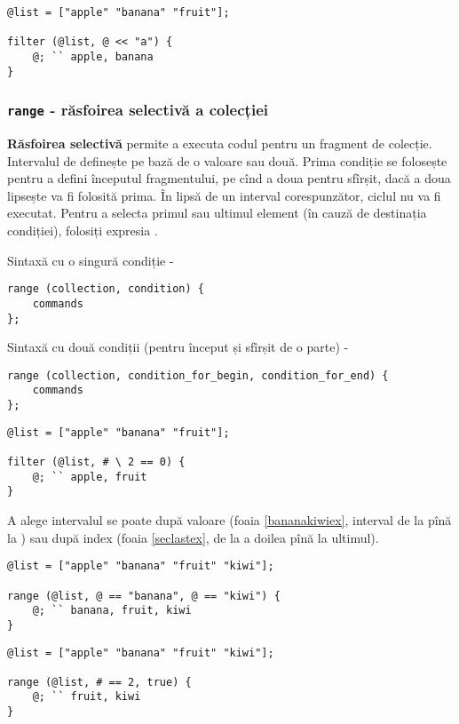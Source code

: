 \begin{lstlisting}[caption=Filtrare pe bază de valoare, label=filterdataex]
@list = ["apple" "banana" "fruit"];

filter (@list, @ << "a") {
	@; `` apple, banana
}
\end{lstlisting}

\subsubsection{\lstinline|range| - răsfoirea selectivă a colecției}

{\bf Răsfoirea selectivă} permite a executa codul pentru un fragment de colecție. Intervalul de definește pe bază de o valoare sau două. Prima condiție se folosește pentru a defini începutul fragmentului, pe cînd a doua pentru sfîrșit, dacă a doua lipsește va fi folosită prima. În lipsă de un interval corespunzător, ciclul nu va fi executat. Pentru a selecta primul sau ultimul element (în cauză de destinația condiției), folosiți expresia \true{}.

Sintaxă cu o singură condiție -
\begin{lstlisting}[numbers=none]
range (collection, condition) {
	commands
};
\end{lstlisting}

Sintaxă cu două condiții (pentru început și sfîrșit de o parte) -
\begin{lstlisting}[numbers=none]
range (collection, condition_for_begin, condition_for_end) {
	commands
};
\end{lstlisting}

\begin{lstlisting}[caption=Filtare după index, label=filterindexex]
@list = ["apple" "banana" "fruit"];

filter (@list, # \ 2 == 0) {
	@; `` apple, fruit
}
\end{lstlisting}

A alege intervalul se poate după valoare (foaia \ref{bananakiwiex}, interval de la  pînă la ) sau după index (foaia \ref{seclastex}, de la a doilea pînă la ultimul).

\begin{lstlisting}[caption=Interval: de la banana pîna la kiwi, label=bananakiwiex]
@list = ["apple" "banana" "fruit" "kiwi"];

range (@list, @ == "banana", @ == "kiwi") {
	@; `` banana, fruit, kiwi
}
\end{lstlisting}

\begin{lstlisting}[caption=Interval: de la al doilea pînă la ultimul, label=seclastex]
@list = ["apple" "banana" "fruit" "kiwi"];

range (@list, # == 2, true) {
	@; `` fruit, kiwi
}
\end{lstlisting}

